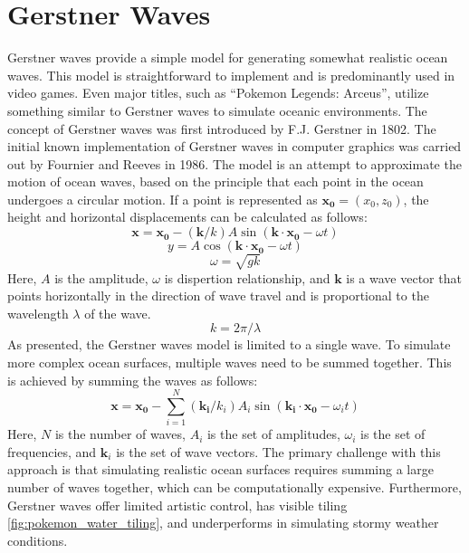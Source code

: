 \section{Gerstner Waves}
Gerstner waves provide a simple model for generating somewhat realistic ocean waves. This model is straightforward to implement and is predominantly used in video games. Even major titles, such as “Pokemon Legends: Arceus”, utilize something similar to Gerstner waves to simulate oceanic environments.
The concept of Gerstner waves was first introduced by F.J. Gerstner \cite{Franz1809} in 1802. The initial known implementation of Gerstner waves in computer graphics was carried out by Fournier and Reeves \cite{AlainWilliam1986} in 1986. The model is an attempt to approximate the motion of ocean waves, based on the principle that each point in the ocean undergoes a circular motion.
If a point is represented as $\mathbf{x_0} = (x_0, z_0)$, the height and horizontal displacements can be calculated as follows:
\begin{equation}
\mathbf{x} = \mathbf{x_0} - (\mathbf{k} / k) A \sin(\mathbf{k} \cdot \mathbf{x_0} - \omega t)
\end{equation}
\begin{equation}
    y = A \cos(\mathbf{k} \cdot \mathbf{x_0} - \omega t)
\end{equation}
\begin{equation}
    \omega = \sqrt{gk}
\end{equation}
Here, $A$ is the amplitude, $\omega$ is dispertion relationship, and $\mathbf{k}$ is a wave vector that points horizontally in the direction of wave travel and is proportional to the wavelength $\lambda$ of the wave.
\begin{equation}
k = 2 \pi / \lambda
\end{equation}
As presented, the Gerstner waves model is limited to a single wave. To simulate more complex ocean surfaces, multiple waves need to be summed together. This is achieved by summing the waves as follows:
\begin{equation}
\mathbf{x} = \mathbf{x_0} - \sum_{i=1}^{N} (\mathbf{k_i} / k_i) A_i \sin(\mathbf{k_i} \cdot \mathbf{x_0} - \omega_i t)
\end{equation}
Here, $N$ is the number of waves, $A_i$ is the set of amplitudes, $\omega_i$ is the set of frequencies, and $\mathbf{k}_i$ is the set of wave vectors.
The primary challenge with this approach is that simulating realistic ocean surfaces requires summing a large number of waves together, which can be computationally expensive. 
Furthermore, Gerstner waves offer limited artistic control, has visible tiling \ref{fig:pokemon_water_tiling}, and underperforms in simulating stormy weather conditions.

